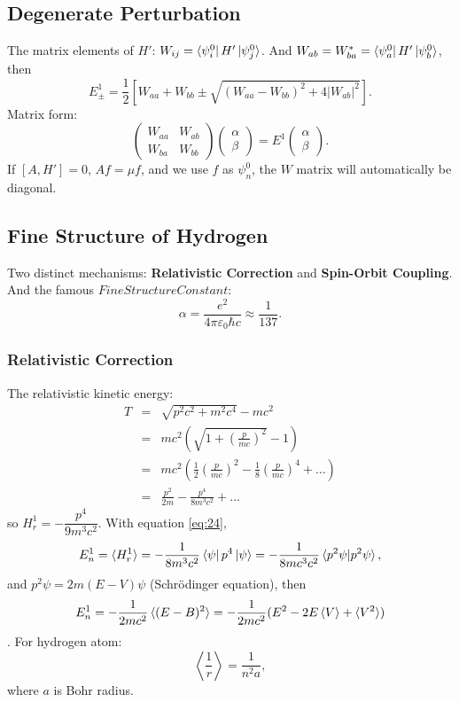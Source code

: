 \documentclass[12pt, 
]{article}
\begin{document}
\subsection{Degenerate Perturbation}
The matrix elements of $H'$: $W_{ij}=\bra{\psi_i^0}H'\ket{\psi_j^0}$. And $W_{ab}=W_{ba}^*=\bra{\psi^0_a}H'\ket{\psi_b^0}$, then
\[
	E^1_\pm=\frac{1}{2}\left[W_{aa}+W_{bb}\pm\sqrt{(W_{aa}-W_{bb})^2+4|W_{ab}|^2}\right].
\]
Matrix form:
\[
	\begin{pmatrix}
		W_{aa}&W_{ab}\\W_{ba}&W_{bb}
	\end{pmatrix} \begin{pmatrix}
		\alpha\\\beta
	\end{pmatrix}=E^1 \begin{pmatrix}
		\alpha\\\beta
	\end{pmatrix}.
\]
If $[A,H']=0$, $Af=\mu f$, and we use $f$ as $\psi_n^0$, the $W$ matrix will automatically be diagonal.
~\\

\subsection{Fine Structure of Hydrogen}
Two distinct mechanisms: {\bf Relativistic Correction} and {\bf Spin-Orbit Coupling}. And the famous $Fine Structure Constant$:
\[
	\alpha=\frac{e^2}{4\pi\varepsilon_0\hbar c}\approx\frac{1}{137}.
\]
\subsubsection{Relativistic Correction}
The relativistic kinetic energy:
\begin{eqnarray*}
	T&=&\sqrt{p^2 c^2+m^2c^4}-mc^2\\
	&=&mc^2(\sqrt{1+\left(\frac{p}{mc}\right)^2}-1)\\
	&=&mc^2(\frac{1}{2}\left(\frac{p}{mc}\right)^2-\frac{1}{8}\left(\frac{p}{mc}\right)^4+\dots)\\
	&=&\frac{p^2}{2m}-\frac{p^4}{8m^3c^2}+\dots
\end{eqnarray*}
so $H^1_r=-\dfrac{p^4}{9m^3c^2}$. With equation \eqref{eq:24},
\[
	E_n^1=\braket{H_r^1}=-\frac{1}{8m^3c^2}\bra{\psi}p^4\ket{\psi}=-\frac{1}{8mc^3c^2}\braket{p^2\psi|p^2\psi},
\]
and $p^2\psi=2m(E-V)\psi$ (Schr\"odinger equation), then
\[
	E^1_n=-\frac{1}{2mc^2}\braket{(E-B)^2}=-\frac{1}{2mc^2}(E^2-2E\braket{V}+\braket{V^2})
\].
For hydrogen atom:
\[
	\left<\frac{1}{r}\right>=\frac{1}{n^2a},
\]
where $a$ is Bohr radius.
~\\
\end{document}
